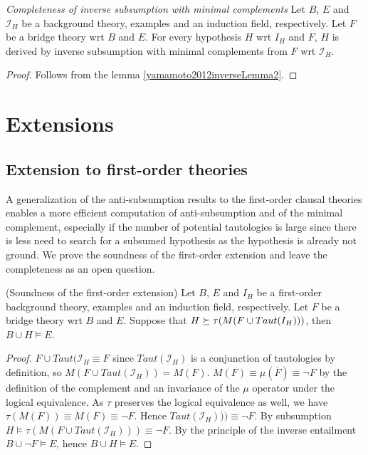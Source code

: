 \begin{thm}\emph{Completeness of inverse subsumption with minimal complements} Let $B$, $E$ and $\mathcal{I}_H$ be a background theory, examples and an induction field,
respectively. Let $F$ be a bridge theory wrt $B$ and $E$. For every hypothesis $H$ wrt $I_H$ and $F$,
$H$ is derived by inverse subsumption with minimal complements from $F$ wrt $\mathcal{I}_H$.
\end{thm}
\begin{proof}
Follows from the lemma \ref{yamamoto2012inverseLemma2}.
\end{proof}
\section{Extensions}\label{inverse_subsumption_extensions}
\subsection{Extension to first-order theories}
A generalization of the anti-subsumption results to the first-order clausal theories enables a more efficient computation of anti-subsumption and of the minimal complement, especially if the number of potential tautologies is large since there is less need to search for a subsumed hypothesis as the hypothesis is already not ground. We prove the soundness of the first-order extension and leave the completeness as an open question.

\begin{proposition}\label{soundness_first_order_extension}(Soundness of the first-order extension)
Let $B$, $E$ and $I_H$ be a first-order background theory, examples and an induction field, respectively. Let $F$ be a bridge theory wrt $B$ and $E$. Suppose that $H \succeq \tau(M(F \cup Taut(I_H)))$, then $B \cup H \models E$.
\end{proposition}
\begin{proof}
$F \cup Taut(\mathcal{I}_H \equiv F$ since $Taut(\mathcal{I}_H)$ is a conjunction of tautologies by definition, so $M(F \cup Taut(\mathcal{I}_H))=M(F)$.
$M(F) \equiv \mu(\overline{F}) \equiv \neg F$ by the definition of the complement and an invariance of the $\mu$ operator under the logical equivalence. As $\tau$ preserves the logical equivalence as well, we have $\tau(M(F)) \equiv M(F) \equiv \neg F$. Hence $Taut(\mathcal{I}_H))) \equiv \neg F$.
By subsumption $H \models \tau(M(F \cup Taut(\mathcal{I}_H))) \equiv \neg F$. By the principle of the inverse entailment $B \cup \neg F \models E$, hence
$B \cup H \models E$.
\end{proof}

